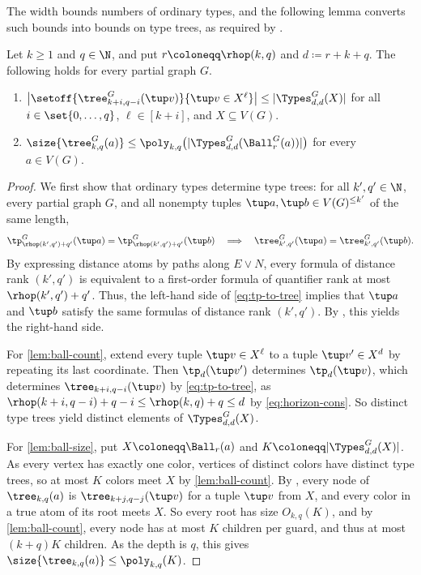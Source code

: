 The width bounds numbers of ordinary types, and the following lemma converts such bounds into bounds on type trees, as required by .

\begin{lemma}\label{lem:ball-tree-bound}
Let $k\ge1$ and $q\in\N$, and put $r\coloneqq\rhop(k,q)$ and $d\coloneqq r+k+q$.
The following holds for every partial graph $G$.
\begin{enumerate}[label=(\roman*)]
\item\label{lem:ball-count}
$\bigl|\setoff{\tree^G_{k+i,q-i}(\tup v)}{\tup v\in X^{\ell}}\bigr|
\le|\Types^G_{d,d}(X)|$ for all $i\in\set{0,\ldots,q}$, $\ell\in [k+i]$, and $X\subseteq V(G)$.
\item\label{lem:ball-size}
$\size{\tree^G_{k,q}(a)}
\le
\poly_{k,q}\bigl(|\Types^G_{d,d}(\Ball^G_r(a))|\bigr)$ for every $a\in V(G)$.
\end{enumerate}
\end{lemma}
\begin{proof}
We first show that ordinary types determine type trees: for all $k',q'\in\N$, every partial graph $G$, and all nonempty tuples $\tup a,\tup b\in V(G)^{\le k'}$ of the same length,
\begin{equation}\label{eq:tp-to-tree}
\tp^G_{\rhop(k',q')+q'}(\tup a)=\tp^G_{\rhop(k',q')+q'}(\tup b)
\quad\Longrightarrow\quad
\tree^G_{k',q'}(\tup a)=\tree^G_{k',q'}(\tup b).
\end{equation}
By expressing distance atoms by paths along $E\lor N$, every \distFO formula of distance rank $(k',q')$ is equivalent to a first-order formula of quantifier rank at most $\rhop(k',q')+q'$. Thus, the left-hand side of \eqref{eq:tp-to-tree} implies that $\tup a$ and $\tup b$ satisfy
the same \distFO formulas of distance rank $(k',q')$.
By , this yields the right-hand side.

For \ref{lem:ball-count}, extend every tuple $\tup v\in X^\ell$ to a tuple $\tup v'\in X^d$ by repeating its last coordinate.
Then $\tp_d(\tup v')$ determines $\tp_d(\tup v)$, which determines $\tree_{k+i,q-i}(\tup v)$ by \eqref{eq:tp-to-tree}, as $\rhop(k+i,q-i)+q-i\le \rhop(k,q)+q\le d$ by \eqref{eq:horizon-cons}.
So distinct type trees yield distinct elements of $\Types^G_{d,d}(X)$.

For \ref{lem:ball-size}, put $X\coloneqq\Ball_r(a)$ and $K\coloneqq|\Types^G_{d,d}(X)|$.
As every vertex has exactly one color, vertices of distinct colors have distinct type trees, so at most $K$ colors meet $X$ by \ref{lem:ball-count}.
By , every node of $\tree_{k,q}(a)$ is $\tree_{k+j,q-j}(\tup v)$ for a tuple $\tup v$ from $X$, and every color in a true atom of its root meets $X$.
So every root has size $O_{k,q}(K)$, and by \ref{lem:ball-count}, every node has at most $K$ children per guard, and thus at most $(k+q)K$ children.
As the depth is $q$, this gives $\size{\tree_{k,q}(a)}\le\poly_{k,q}(K)$.
\end{proof}

